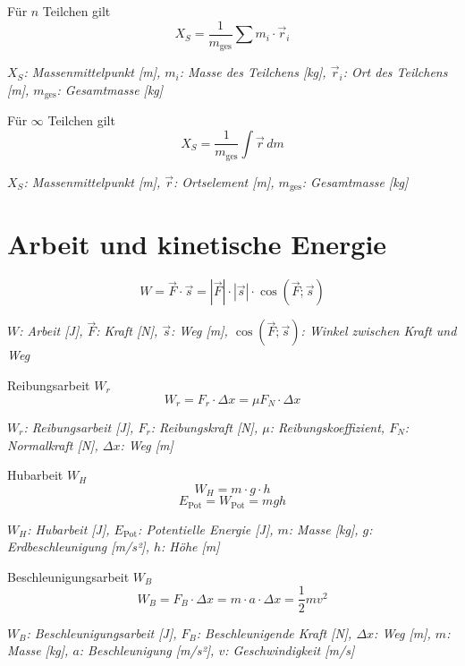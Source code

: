 \documentclass[a4paper,10pt]{article}
\newenvironment{displayformula}
{
	\begin{framed}
		\color{formulaColor}
	}
	{\end{framed}}
\newcommand{\formulalegend}[1]{%
	\par\vspace{0.5ex}%
	{{\color{legendColor}\RaggedRight\small\textit{#1}}}%
	\par\vspace{1.5ex}%
}
\begin{document}
\begin{displayformula}
	Für \( n \) Teilchen gilt
	\[
	X_S = \frac{1}{m_{\text{ges}}} \sum m_i \cdot \vec{r}_i
	\]
\end{displayformula}
\formulalegend{
	\( X_S \): Massenmittelpunkt [m], \( m_i \): Masse des Teilchens [kg], \( \vec{r}_i \): Ort des Teilchens [m], \( m_{\text{ges}} \): Gesamtmasse [kg]
}

\begin{displayformula}
	Für \( \infty \) Teilchen gilt
	\[
	X_S = \frac{1}{m_{\text{ges}}} \int \vec{r} \, dm
	\]
\end{displayformula}
\formulalegend{
	\( X_S \): Massenmittelpunkt [m], \( \vec{r} \): Ortselement [m], \( m_{\text{ges}} \): Gesamtmasse [kg]
}



\section{Arbeit und kinetische Energie}

\begin{displayformula}
	\[
	W = \vec{F} \cdot \vec{s} = |\vec{F}| \cdot |\vec{s}| \cdot \cos(\vec{F}; \vec{s})
	\]
\end{displayformula}
\formulalegend{
	\( W \): Arbeit [J], \( \vec{F} \): Kraft [N], \( \vec{s} \): Weg [m], \( \cos(\vec{F}; \vec{s}) \): Winkel zwischen Kraft und Weg
}

\begin{displayformula}
	Reibungsarbeit \( W_r \)
	\[
	W_r = F_r \cdot \Delta x = \mu F_N \cdot \Delta x
	\]
\end{displayformula}
\formulalegend{
	\( W_r \): Reibungsarbeit [J], \( F_r \): Reibungskraft [N], \( \mu \): Reibungskoeffizient, \( F_N \): Normalkraft [N], \( \Delta x \): Weg [m]
}

\begin{displayformula}
	Hubarbeit \( W_H \)
	\[
	W_H = m \cdot g \cdot h
	\]
	\[
	E_{\text{Pot}} = W_{\text{Pot}} = mgh
	\]
\end{displayformula}
\formulalegend{
	\( W_H \): Hubarbeit [J], \( E_{\text{Pot}} \): Potentielle Energie [J], \( m \): Masse [kg], \( g \): Erdbeschleunigung [m/s²], \( h \): Höhe [m]
}

\begin{displayformula}
	Beschleunigungsarbeit \( W_B \)
	\[
	W_B = F_B \cdot \Delta x = m \cdot a \cdot \Delta x = \frac{1}{2} mv^2
	\]
\end{displayformula}
\formulalegend{
	\( W_B \): Beschleunigungsarbeit [J], \( F_B \): Beschleunigende Kraft [N], \( \Delta x \): Weg [m], \( m \): Masse [kg], \( a \): Beschleunigung [m/s²], \( v \): Geschwindigkeit [m/s]
}
\end{document}
